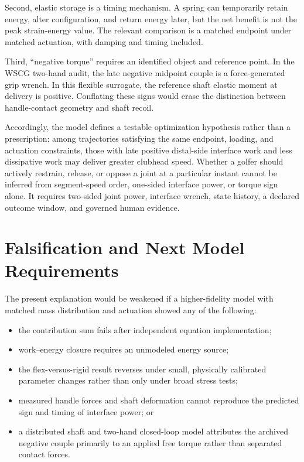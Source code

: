 \documentclass[
  letterpaper,
]{report}
\providecommand{\tightlist}{%
  \setlength{\itemsep}{0pt}\setlength{\parskip}{0pt}}
\begin{document}
Second, elastic storage is a timing mechanism. A spring can temporarily
retain energy, alter configuration, and return energy later, but the net
benefit is not the peak strain-energy value. The relevant comparison is
a matched endpoint under matched actuation, with damping and timing
included.

Third, ``negative torque'' requires an identified object and reference
point. In the WSCG two-hand audit, the late negative midpoint couple is
a force-generated grip wrench. In this flexible surrogate, the reference
shaft elastic moment at delivery is positive. Conflating these signs
would erase the distinction between handle-contact geometry and shaft
recoil.

Accordingly, the model defines a testable optimization hypothesis rather
than a prescription: among trajectories satisfying the same endpoint,
loading, and actuation constraints, those with late positive distal-side
interface work and less dissipative work may deliver greater clubhead
speed. Whether a golfer should actively restrain, release, or oppose a
joint at a particular instant cannot be inferred from segment-speed
order, one-sided interface power, or torque sign alone. It requires
two-sided joint power, interface wrench, state history, a declared
outcome window, and governed human evidence.

\section{Falsification and Next Model
Requirements}\label{sec-shaft-falsification}

The present explanation would be weakened if a higher-fidelity model
with matched mass distribution and actuation showed any of the
following:

\begin{itemize}
\tightlist
\item
  the contribution sum fails after independent equation implementation;
\item
  work--energy closure requires an unmodeled energy source;
\item
  the flex-versus-rigid result reverses under small, physically
  calibrated parameter changes rather than only under broad stress
  tests;
\item
  measured handle forces and shaft deformation cannot reproduce the
  predicted sign and timing of interface power; or
\item
  a distributed shaft and two-hand closed-loop model attributes the
  archived negative couple primarily to an applied free torque rather
  than separated contact forces.
\end{itemize}
\end{document}

